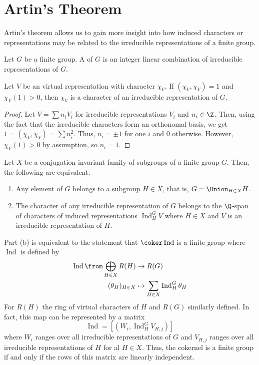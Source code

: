 \documentclass[11pt,leqno,oneside]{amsbook}
\newcommand{\Ind}{\operatorname{Ind}}
\numberwithin{thm}{section}
\begin{document}
\section{Artin's Theorem}
Artin's theorem allows us to gain more insight into how induced
characters or representations may be related to the irreducible
representations of a finite group.
\begin{defn}
  Let \(G\) be a finite group. A  of \(G\)
  is an integer linear combination of irreducible representations of
  \(G\). 
\end{defn}
\begin{prop}
  Let \(V\) be an virtual representation with character \(\chi_V\). If
  \((\chi_V,\chi_V)=1\) and \(\chi_V(1) > 0\), then \(\chi_V\) is a
  character of an irreducible representation of \(G\).
\end{prop}
\begin{proof}
  Let \(V = \sum n_i V_i\) for irreducible representations \(V_i\) and
  \(n_i \in \Z\). Then, using the fact that the irreducible characters
  form an orthonomal basis, we get \(1 = (\chi_V,\chi_V) = \sum
  n_i^2\). Thus, \(n_i = \pm 1\) for one \(i\) and \(0\)
  otherwise. However, \(\chi_V(1) > 0\) by assumption, so \(n_i = 1\).
\end{proof}
\begin{thm}
  Let \(X\) be a conjugation-invariant family of subgroups of a finite
  group \(G\). Then, the following are equivalent.
  \begin{enumerate}
  \item Any element of \(G\) belongs to a subgroup \(H \in X\), that
    is, \(G = \Union_{H \in X} H\).
  \item The character of any irreducible representation of \(G\)
    belongs to the \(\Q\)-span of characters of induced
    representations \(\Ind_H^G V\) where \(H \in X\) and \(V\) is an
    irreducible representation of \(H\). 
  \end{enumerate}
\end{thm}
\begin{rmk}
  Part (b) is equivalent to the statement that \(\coker \Ind\) is a
  finite group where \(\Ind\) is defined by
  \begin{align*}
    \Ind \from \bigoplus_{H \in X} R(H) & \to R(G) \\
    (\theta_H)_{H \in X} & \mapsto \sum_{H \in X} \Ind_H^G \theta_H
  \end{align*}
  For \(R(H)\) the ring of virtual characters of \(H\) and \(R(G)\)
  similarly defined. In fact, this map can be represented by a
  matrix \[
    \Ind = \left[ (W_i, \Ind_H^G V_{H,j}) \right]
  \]
  where \(W_i\) ranges over all irreducible representations of \(G\)
  and \(V_{H,j}\) ranges over all irreducible representations of \(H\)
  for al \(H \in X\). Thus, the cokernel is a finite group if and only
  if the rows of this matrix are linearly independent.
\end{rmk}
\end{document}

